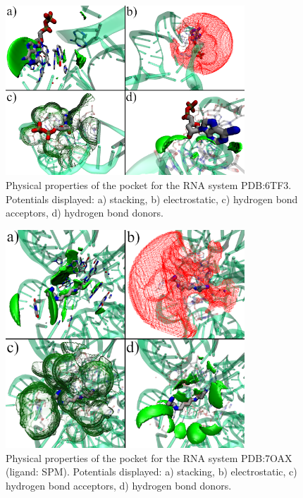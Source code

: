 \begin{figure}[H]
  \centering
  \includegraphics[width=0.8\textwidth]{figures/appendix/benchmark_rna/6tf3.png}
  \caption{\label{fig:appx_benchmark/6tf3} Physical properties of the pocket for the RNA system PDB:6TF3. Potentials displayed: a) stacking, b) electrostatic, c) hydrogen bond acceptors, d) hydrogen bond donors.}
\end{figure}

\begin{figure}[H]
  \centering
  \includegraphics[width=0.8\textwidth]{figures/appendix/benchmark_rna/7oax0.png}
  \caption{\label{fig:appx_benchmark/7oax0} Physical properties of the pocket for the RNA system PDB:7OAX (ligand: SPM). Potentials displayed: a) stacking, b) electrostatic, c) hydrogen bond acceptors, d) hydrogen bond donors.}
\end{figure}

